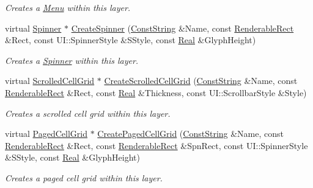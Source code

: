 \begin{DoxyCompactItemize}
\begin{DoxyCompactList}\small\item\em Creates a \hyperlink{classphys_1_1UI_1_1Menu}{Menu} within this layer. \item\end{DoxyCompactList}\item 
virtual \hyperlink{classphys_1_1UI_1_1Spinner}{Spinner} $\ast$ \hyperlink{classphys_1_1UI_1_1Layer_aaa21b066649965bec3b992b92fe0eeb7}{CreateSpinner} (\hyperlink{namespacephys_a5ce5049f8b4bf88d6413c47b504ebb31}{ConstString} \&Name, const \hyperlink{structphys_1_1UI_1_1RenderableRect}{RenderableRect} \&Rect, const UI::SpinnerStyle \&SStyle, const \hyperlink{namespacephys_af7eb897198d265b8e868f45240230d5f}{Real} \&GlyphHeight)
\begin{DoxyCompactList}\small\item\em Creates a \hyperlink{classphys_1_1UI_1_1Spinner}{Spinner} within this layer. \item\end{DoxyCompactList}\item 
virtual \hyperlink{classphys_1_1UI_1_1ScrolledCellGrid}{ScrolledCellGrid} $\ast$ \hyperlink{classphys_1_1UI_1_1Layer_a967b2ff1bcc006a909b623325182da4a}{CreateScrolledCellGrid} (\hyperlink{namespacephys_a5ce5049f8b4bf88d6413c47b504ebb31}{ConstString} \&Name, const \hyperlink{structphys_1_1UI_1_1RenderableRect}{RenderableRect} \&Rect, const \hyperlink{namespacephys_af7eb897198d265b8e868f45240230d5f}{Real} \&Thickness, const UI::ScrollbarStyle \&Style)
\begin{DoxyCompactList}\small\item\em Creates a scrolled cell grid within this layer. \item\end{DoxyCompactList}\item 
virtual \hyperlink{classphys_1_1UI_1_1PagedCellGrid}{PagedCellGrid} $\ast$ \hyperlink{classphys_1_1UI_1_1Layer_a1c8326e5c53dc64d53288883d8a0496a}{CreatePagedCellGrid} (\hyperlink{namespacephys_a5ce5049f8b4bf88d6413c47b504ebb31}{ConstString} \&Name, const \hyperlink{structphys_1_1UI_1_1RenderableRect}{RenderableRect} \&Rect, const \hyperlink{structphys_1_1UI_1_1RenderableRect}{RenderableRect} \&SpnRect, const UI::SpinnerStyle \&SStyle, const \hyperlink{namespacephys_af7eb897198d265b8e868f45240230d5f}{Real} \&GlyphHeight)
\begin{DoxyCompactList}\small\item\em Creates a paged cell grid within this layer. \item\end{DoxyCompactList}\item 

\end{DoxyCompactItemize}
